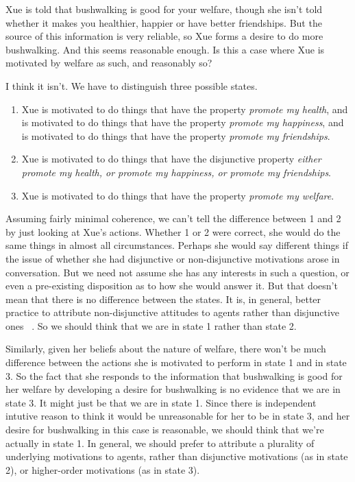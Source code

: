 \gls{Xue} is told that bushwalking is good for your welfare, though she isn't told whether it makes you healthier, happier or have better friendships. But the source of this information is very reliable, so \gls{Xue} forms a desire to do more bushwalking. And this seems reasonable enough. Is this a case where \gls{Xue} is motivated by welfare as such, and reasonably so?

I think it isn't. We have to distinguish three possible states.

\begin{enumerate}
\item{} \gls{Xue} is motivated to do things that have the property \emph{promote my health}, and is motivated to do things that have the property \emph{promote my happiness}, and is motivated to do things that have the property \emph{promote my friendships}.

\item{} \gls{Xue} is motivated to do things that have the disjunctive property \emph{either promote my health, or promote my happiness, or promote my friendships}.

\item{} \gls{Xue} is motivated to do things that have the property \emph{promote my welfare}.

\end{enumerate}
Assuming fairly minimal coherence, we can't tell the difference between 1 and 2 by just looking at \gls{Xue}'s actions. Whether 1 or 2 were correct, she would do the same things in almost all circumstances. Perhaps she would say different things if the issue of whether she had disjunctive or non-disjunctive motivations arose in conversation. But we need not assume she has any interests in such a question, or even a pre-existing disposition as to how she would answer it. But that doesn't mean that there is no difference between the states. It is, in general, better practice to attribute non-disjunctive attitudes to agents rather than disjunctive ones ~\citep{Lewis1994b, Weatherson2013Lewis}. So we should think that we are in state 1 rather than state 2.

Similarly, given her beliefs about the nature of welfare, there won't be much difference between the actions she is motivated to perform in state 1 and in state 3. So the fact that she responds to the information that bushwalking is good for her welfare by developing a desire for bushwalking is no evidence that we are in state 3. It might just be that we are in state 1. Since there is independent intutive reason to think it would be unreasonable for her to be in state 3, and her desire for bushwalking in this case is reasonable, we should think that we're actually in state 1. In general, we should prefer to attribute a plurality of underlying motivations to agents, rather than disjunctive motivations (as in state 2), or higher-order motivations (as in state 3).

